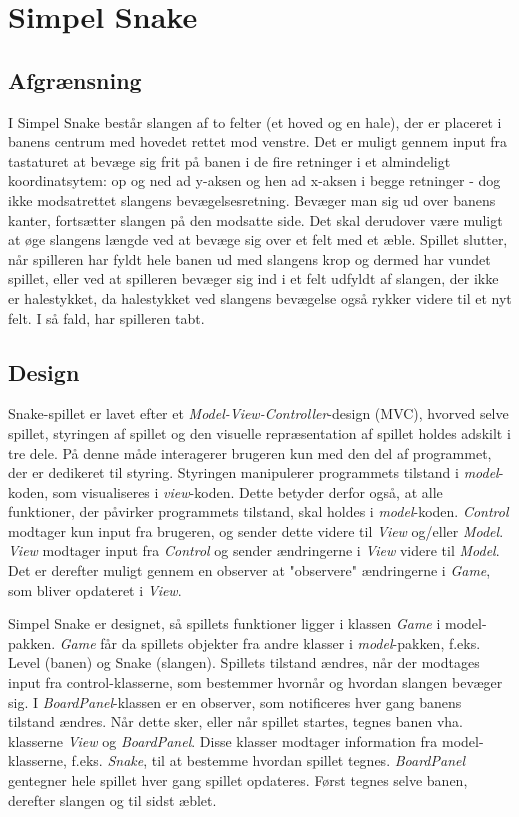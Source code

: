 \documentclass{report}
\begin{document}
\chapter{Simpel Snake}
\section{Afgrænsning}
I Simpel Snake består slangen af to felter (et hoved og en hale), der er placeret i banens centrum med hovedet rettet mod venstre. Det er muligt gennem input fra tastaturet at bevæge sig frit på banen i de fire retninger i et almindeligt koordinatsytem: op og ned ad y-aksen og hen ad x-aksen i begge retninger - dog ikke modsatrettet slangens bevægelsesretning. Bevæger man sig ud over banens kanter, fortsætter slangen på den modsatte side. Det skal derudover være muligt at øge slangens længde ved at bevæge sig over et felt med et æble. Spillet slutter, når spilleren har fyldt hele banen ud med slangens krop og dermed har vundet spillet, eller ved at spilleren bevæger sig ind i et felt udfyldt af slangen, der ikke er halestykket, da halestykket ved slangens bevægelse også rykker videre til et nyt felt. I så fald, har spilleren tabt.

\section{Design}
Snake-spillet er lavet efter et \textit{Model-View-Controller}-design (MVC), hvorved selve spillet, styringen af spillet og den visuelle repræsentation af spillet holdes adskilt i tre dele. På denne måde interagerer brugeren kun med den del af programmet, der er dedikeret til styring. Styringen manipulerer programmets tilstand i \textit{model}-koden, som visualiseres i \textit{view}-koden. Dette betyder derfor også, at alle funktioner, der påvirker programmets tilstand, skal holdes i \textit{model}-koden. \textit{Control} modtager kun input fra brugeren, og sender dette videre til \textit{View} og/eller \textit{Model}. \textit{View} modtager input fra \textit{Control} og sender ændringerne i \textit{View} videre til \textit{Model}. Det er derefter muligt gennem en observer at "observere" ændringerne i \textit{Game}, som bliver opdateret i \textit{View}.

Simpel Snake er designet, så spillets funktioner ligger i klassen \textit{Game} i model-pakken. \textit{Game} får da spillets objekter fra andre klasser i \textit{model}-pakken, f.eks. Level (banen) og Snake (slangen). Spillets tilstand ændres, når der modtages input fra control-klasserne, som bestemmer hvornår og hvordan slangen bevæger sig. I \textit{BoardPanel}-klassen er en observer, som notificeres hver gang banens tilstand ændres. Når dette sker, eller når spillet startes, tegnes banen vha. klasserne \textit{View} og \textit{BoardPanel}. Disse klasser modtager information fra model-klasserne, f.eks. \textit{Snake}, til at bestemme hvordan spillet tegnes. \textit{BoardPanel} gentegner hele spillet hver gang spillet opdateres. Først tegnes selve banen, derefter slangen og til sidst æblet. 
\end{document}
